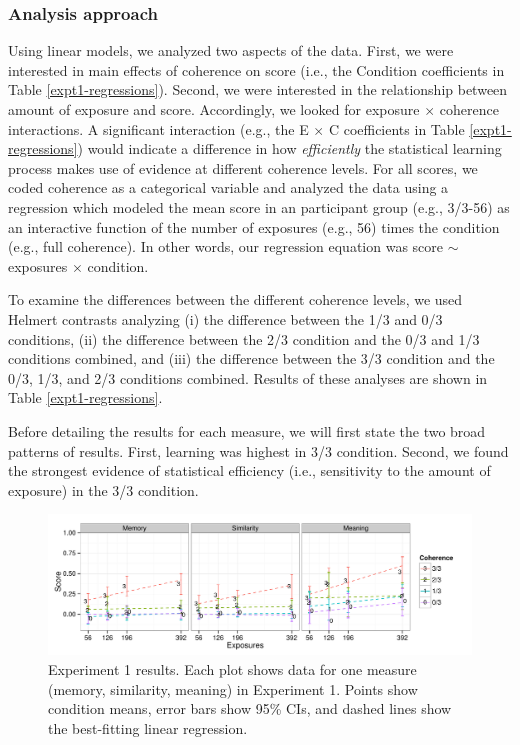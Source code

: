 \documentclass[man,floatsintext]{apa6}
\begin{document}
\subsubsection{Analysis approach}
Using linear models, we analyzed two aspects of the data. First, we were interested in main effects of coherence on score (i.e., the Condition coefficients in Table \ref{expt1-regressions}). Second, we were interested in the relationship between amount of exposure and score. Accordingly, we looked for exposure $\times$ coherence interactions. A significant interaction (e.g., the E $\times$ C coefficients in Table \ref{expt1-regressions}) would indicate a difference in how \emph{efficiently} the statistical learning process makes use of evidence at different coherence levels. For all scores, we coded coherence as a categorical variable and analyzed the data using a regression which modeled the mean score in an participant group (e.g., 3/3-56) as an interactive function of the number of exposures (e.g., 56) times the condition (e.g., full coherence). In other words, our regression equation was score $\sim$ exposures $\times$ condition.

To examine the differences between the different coherence levels, we used Helmert contrasts analyzing (i) the difference between the 1/3 and 0/3 conditions, (ii) the difference between the 2/3 condition and the 0/3 and 1/3 conditions combined, and (iii) the difference between the 3/3 condition and the 0/3, 1/3, and 2/3 conditions combined. Results of these analyses are shown in Table \ref{expt1-regressions}.

Before detailing the results for each measure, we will first state the two broad patterns of results. First, learning was highest in 3/3 condition. Second, we found the strongest evidence of statistical efficiency (i.e., sensitivity to the amount of exposure) in the 3/3 condition.

\begin{figure}[t]
  \begin{center}
    \includegraphics[width=1.0\linewidth]{x1.pdf}
    \caption{Experiment 1 results. Each plot shows data for one
measure (memory, similarity, meaning) in Experiment 1. Points show
condition means, error bars show 95\% CIs, and dashed lines show the
best-fitting linear regression.}
    \label{expt1-results}
  \end{center}
\end{figure}
\end{document}
